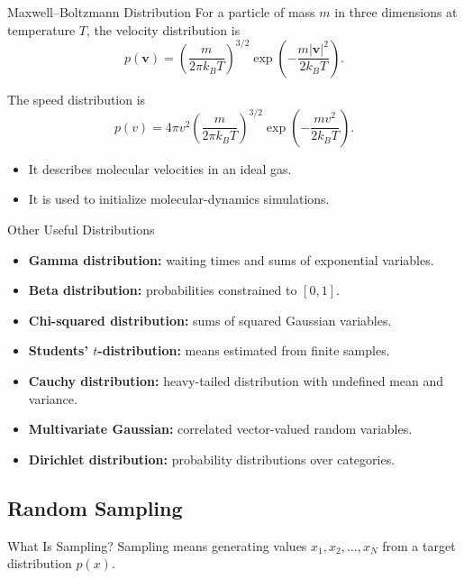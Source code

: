 \documentclass[a4paper, 10pt, onepage]{elegantbook}
\begin{document}
{\begin{frame}{Maxwell--Boltzmann Distribution}
  For a particle of mass \(m\) in three dimensions at temperature \(T\), the velocity distribution is
  \[
    p(\mathbf{v})
    =
    \left(\frac{m}{2\pi k_BT}\right)^{3/2}
    \exp\left(
      -\frac{m|\mathbf{v}|^2}{2k_BT}
    \right).
  \]

  The speed distribution is
  \[
    p(v)
    =
    4\pi v^2
    \left(\frac{m}{2\pi k_BT}\right)^{3/2}
    \exp\left(
      -\frac{mv^2}{2k_BT}
    \right).
  \]

  \begin{itemize}
    \item It describes molecular velocities in an ideal gas.
    \item It is used to initialize molecular-dynamics simulations.
  \end{itemize}
\end{frame}

\begin{frame}{Other Useful Distributions}
  \begin{itemize}
    \item \textbf{Gamma distribution:} waiting times and sums of exponential variables.
    \item \textbf{Beta distribution:} probabilities constrained to \([0,1]\).
    \item \textbf{Chi-squared distribution:} sums of squared Gaussian variables.
    \item \textbf{Students' \(t\)-distribution:} means estimated from finite samples.
    \item \textbf{Cauchy distribution:} heavy-tailed distribution with undefined mean and variance.
    \item \textbf{Multivariate Gaussian:} correlated vector-valued random variables.
    \item \textbf{Dirichlet distribution:} probability distributions over categories.
  \end{itemize}
\end{frame}

\subsection{Random Sampling}

\begin{frame}{What Is Sampling?}
  Sampling means generating values \(x_1,x_2,\ldots,x_N\) from a target distribution \(p(x)\).


\end{frame}}
\end{document}
